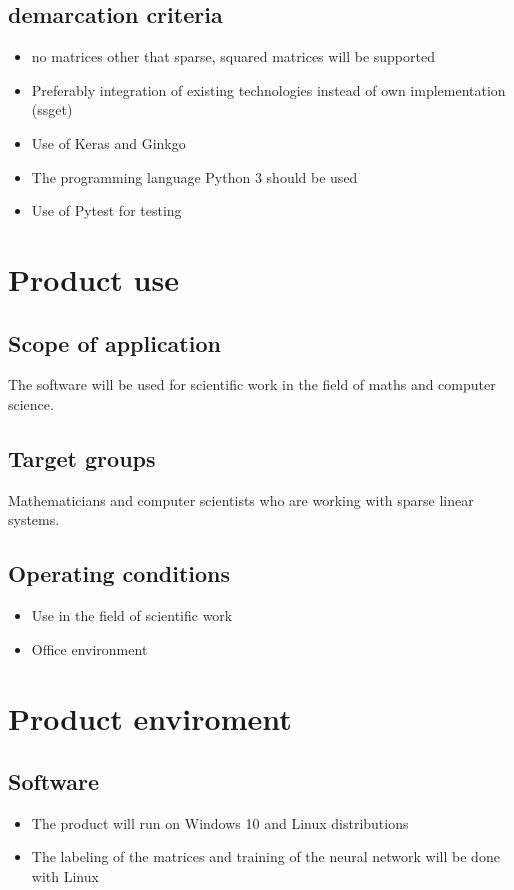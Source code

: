 \documentclass[parskip=full]{scrartcl}
\begin{document}
\subsection{demarcation criteria}
\begin{itemize}
\item no matrices other that sparse, squared matrices will be supported

\item Preferably integration of existing technologies instead of own implementation (\gls{ssget})

\item Use of \gls{Keras} and \gls{Ginkgo}

\item The programming language \gls{Python} 3 should be used

\item Use of \gls{Pytest} for testing

\end{itemize}
\section{Product use}
\subsection{Scope of application}
The software will be used for scientific work in the field of maths and computer science.
\subsection{Target groups}
Mathematicians and computer scientists who are working with sparse linear systems.
\subsection{Operating conditions}

\begin{itemize}
\item Use in the field of scientific work
\item Office environment
\end{itemize}

\section{Product enviroment}


\subsection{Software}
\begin{itemize}
\item The product will run on \gls{Windows} 10 and \gls{Linux} distributions 
\item The labeling of the matrices and training of the \gls{neural network} will be done with \gls{Linux}
\end{itemize}
\end{document}
